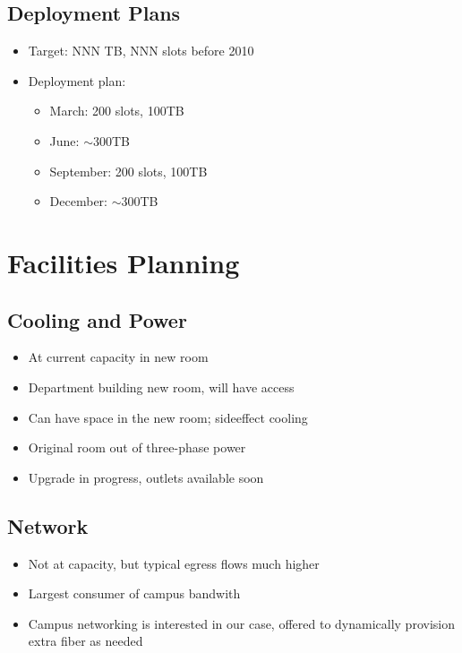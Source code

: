 \documentclass{beamer}
\newcommand{\ca}{\ensuremath{\sim}}
\begin{document}
\subsection{Deployment Plans}
\begin{frame}
\begin{itemize}
    \item Target: NNN TB, NNN slots before 2010
    \item Deployment plan:
    \begin{itemize}
        \item March: 200 slots, 100TB
        \item June: \ca{}300TB
        \item September: 200 slots, 100TB
        \item December: \ca{}300TB
    \end{itemize}
\end{itemize}
\end{frame}

\section{Facilities Planning}
\subsection{Cooling and Power}
\begin{frame}
\begin{itemize}
    \item At current capacity in new room
    \item Department building new room, will have access
    \item Can have space in the new room; sideeffect cooling
    \item Original room out of three-phase power
    \item Upgrade in progress, outlets available soon
\end{itemize}
\end{frame}

\subsection{Network}
\begin{frame}
\begin{itemize}
    \item Not at capacity, but typical egress flows much higher
    \item Largest consumer of campus bandwith
    \item Campus networking is interested in our case, offered to dynamically provision extra fiber as needed
\end{itemize}
\end{frame}
\end{document}

